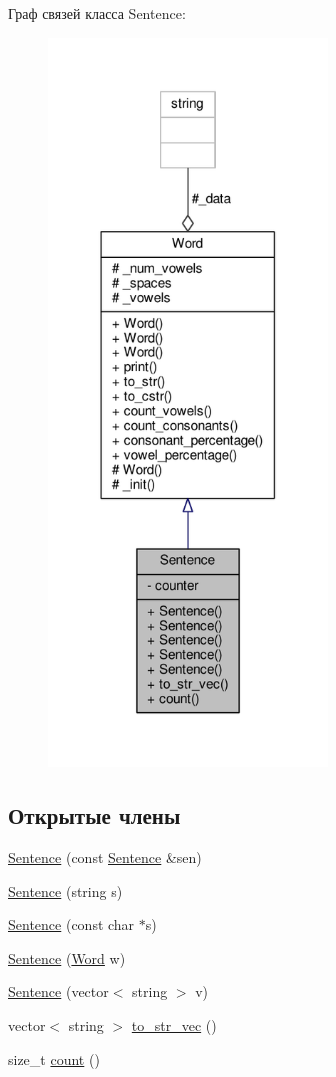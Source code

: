 Граф связей класса Sentence\+:\nopagebreak
\begin{figure}[H]
\begin{center}
\leavevmode
\includegraphics[width=210pt]{classSentence__coll__graph}
\end{center}
\end{figure}
\subsection*{Открытые члены}
\begin{DoxyCompactItemize}
\item 
\hyperlink{classSentence_a3048354db110b3c53f22a0e73f8a2873}{Sentence} (const \hyperlink{classSentence}{Sentence} \&sen)
\item 
\hyperlink{classSentence_abd9587431f7092cacbafbab3deb54eac}{Sentence} (string s)
\item 
\hyperlink{classSentence_af800b4dfcfb0e36de291ce3bd1c4b151}{Sentence} (const char $\ast$s)
\item 
\hyperlink{classSentence_abfcb3ae5846f46f71866330e54288f6e}{Sentence} (\hyperlink{classWord}{Word} w)
\item 
\hyperlink{classSentence_a6735a441c8edf1eab29687f70ce6697e}{Sentence} (vector$<$ string $>$ v)
\item 
vector$<$ string $>$ \hyperlink{classSentence_a1c2e3f16dbbaf2446a1d1f5ddac694d3}{to\+\_\+str\+\_\+vec} ()
\item 
size\+\_\+t \hyperlink{classSentence_a9775e8e13161099b03b281a31fcdf050}{count} ()
\end{DoxyCompactItemize}
